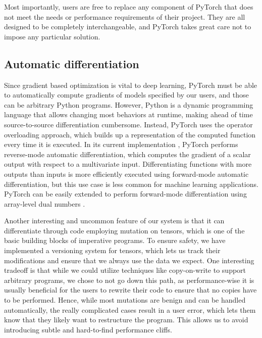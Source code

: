 Most importantly, users are free to replace any component of PyTorch that does not meet the needs or performance requirements of their project. They are all designed to be completely interchangeable, and PyTorch  takes great care not to impose any particular solution.


\subsection{Automatic differentiation}

Since gradient based optimization is vital to deep learning, PyTorch must be able to automatically compute gradients of models specified by our users, and those can be arbitrary Python programs.
However, Python is a dynamic programming language that allows changing most behaviors at runtime, making ahead of time source-to-source differentiation cumbersome.
Instead, PyTorch uses the operator overloading approach, which builds up a representation of the computed function every time it is executed.
In its current implementation \cite{pytorch_autodiff}, PyTorch performs reverse-mode automatic differentiation, which computes the gradient of a scalar output with respect to a multivariate input. Differentiating functions with more outputs than inputs is more efficiently executed using forward-mode automatic differentiation, but this use case is less common for machine learning applications. PyTorch can be easily extended to perform forward-mode differentiation using array-level dual numbers \cite{Piponi-dual-numbers,Leuck-dual-numbers}.

Another interesting and uncommon feature of our system is that it can differentiate through code employing mutation on tensors, which is one of the basic building blocks of imperative programs.
To ensure safety, we have implemented a versioning system for tensors, which lets us track their modifications and ensure that we always use the data we expect.
One interesting tradeoff is that while we could utilize techniques like copy-on-write to support arbitrary programs, we chose to not go down this path, as performance-wise it is usually beneficial for the users to rewrite their code to ensure that no copies have to be performed.
Hence, while most mutations are benign and can be handled automatically, the really complicated cases result in a user error, which lets them know that they likely want to restructure the program.
This allows us to avoid introducing subtle and hard-to-find performance cliffs.

